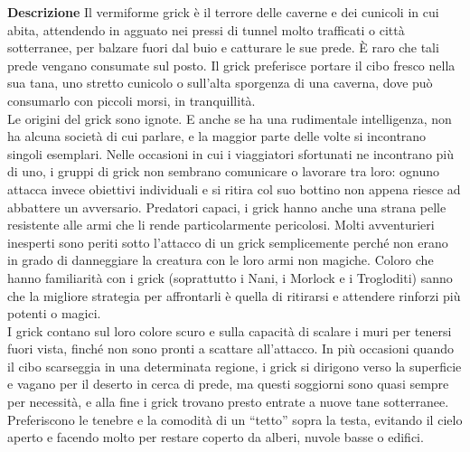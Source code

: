 \begin{multicols}{2}
\textbf{Descrizione}
Il vermiforme grick è il terrore delle caverne e dei cunicoli in cui abita, attendendo in agguato nei pressi di tunnel molto trafficati o città sotterranee, per balzare fuori dal buio e catturare le sue prede. È raro che tali prede vengano consumate sul posto. Il grick preferisce portare il cibo fresco nella sua tana, uno stretto cunicolo o sull’alta sporgenza di una caverna, dove può consumarlo con piccoli morsi, in tranquillità.\\
Le origini del grick sono ignote. E anche se ha una rudimentale intelligenza, non ha alcuna società di cui parlare, e la maggior parte delle volte si incontrano singoli esemplari. Nelle occasioni in cui i viaggiatori sfortunati ne incontrano più di uno, i gruppi di grick non sembrano comunicare o lavorare tra loro: ognuno attacca invece obiettivi individuali e si ritira col suo bottino non appena riesce ad abbattere un avversario. Predatori capaci, i grick hanno anche una strana pelle resistente alle armi che li rende particolarmente pericolosi. Molti avventurieri inesperti sono periti sotto l’attacco di un grick semplicemente perché non erano in grado di danneggiare la creatura con le loro armi non magiche. Coloro che hanno familiarità con i grick (soprattutto i Nani, i Morlock e i Trogloditi) sanno che la migliore strategia per affrontarli è quella di ritirarsi e attendere rinforzi più potenti o magici.\\
I grick contano sul loro colore scuro e sulla capacità di scalare i muri per tenersi fuori vista, finché non sono pronti a scattare all’attacco. In più occasioni quando il cibo scarseggia in una determinata regione, i grick si dirigono verso la superficie e vagano per il deserto in cerca di prede, ma questi soggiorni sono quasi sempre per necessità, e alla fine i grick trovano presto entrate a nuove tane sotterranee. Preferiscono le tenebre e la comodità di un “tetto” sopra la testa, evitando il cielo aperto e facendo molto per restare coperto da alberi, nuvole basse o edifici.\\



\end{multicols}
